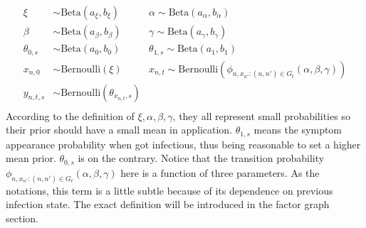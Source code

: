 \documentclass{article} %
\begin{document}
\begin{align*}
\xi&\sim\text{Beta}(a_\xi,b_\xi) \quad &\alpha\sim\text{Beta}(a_\alpha,b_\alpha)\\
\beta&\sim\text{Beta}(a_\beta,b_\beta) \quad  &\gamma\sim\text{Beta}(a_\gamma,b_\gamma)\\
\theta_{0,s}&\sim\text{Beta}(a_0,b_0)\quad &\theta_{1,s}\sim\text{Beta}(a_1,b_1)\\
x_{n,0}&\sim\text{Bernoulli}(\xi)\quad &x_{n,t}\sim\text{Bernoulli}\left(\phi_{n,x_{n'}:(n,n')\in G_t}(\alpha,\beta,\gamma)\right)\\
y_{n,t,s}&\sim\text{Bernoulli}(\theta_{x_{n,t},s})\\
\end{align*}
%
According to the definition of $\xi,\alpha,\beta,\gamma$, they all represent small probabilities so their prior should have a small mean in application. $\theta_{1,s}$ means the symptom appearance probability when got infectious, thus being reasonable to set a higher mean prior. $\theta_{0,s}$ is on the contrary. Notice that the transition probability $\phi_{n,x_{n'}:(n,n')\in G_t}(\alpha,\beta,\gamma)$ here is a function of three parameters. As the notations, this term is a little subtle because of its dependence on previous infection state. The exact definition will be introduced in the factor graph section.
\end{document}
